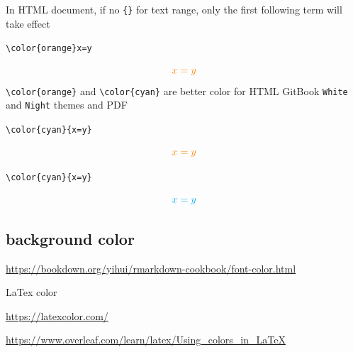 \documentclass[
]{book}
\newenvironment{Shaded}{\begin{snugshade}}{\end{snugshade}}
\newcommand{\NormalTok}[1]{#1}
\theoremstyle{definition}
\theoremstyle{definition}
\theoremstyle{definition}
\theoremstyle{definition}
\theoremstyle{remark}
\begin{document}
In HTML document, if no \texttt{\{\}} for text range, only the first following term will take effect

\texttt{\textbackslash{}color\{orange\}x=y}

\[\color{orange}x=y\]
\texttt{\textbackslash{}color\{orange\}} and \texttt{\textbackslash{}color\{cyan\}} are better color for HTML GitBook \texttt{White} and \texttt{Night} themes and PDF

\texttt{\textbackslash{}color\{cyan\}\{x=y\}}

\[\color{orange}{x=y}\]

\texttt{\textbackslash{}color\{cyan\}\{x=y\}}

\[\color{cyan}{x=y}\]

\begin{Shaded}
\end{Shaded}

\hypertarget{background-color}{%
\subsection{background color}\label{background-color}}

\url{https://bookdown.org/yihui/rmarkdown-cookbook/font-color.html}

LaTex color

\url{https://latexcolor.com/}

\url{https://www.overleaf.com/learn/latex/Using_colors_in_LaTeX}
\end{document}
